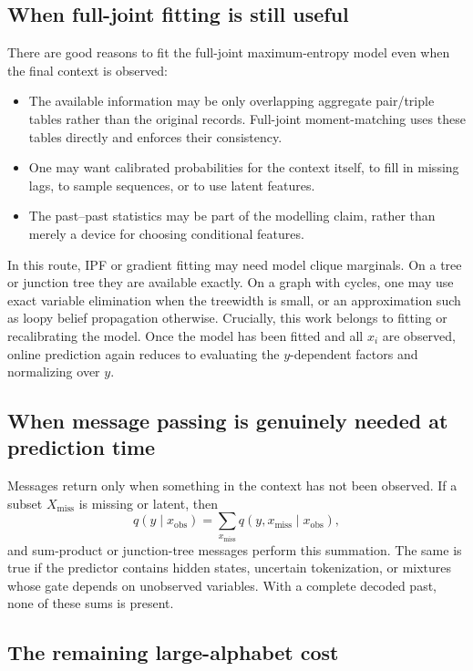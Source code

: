 \documentclass[11pt]{article}
\newcommand{\1}{\mathbf 1}
\begin{document}
\subsection{When full-joint fitting is still useful}

There are good reasons to fit the full-joint maximum-entropy model even when
the final context is observed:
\begin{itemize}
  \item The available information may be only overlapping aggregate
  pair/triple tables rather than the original records.  Full-joint
  moment-matching uses these tables directly and enforces their consistency.
  \item One may want calibrated probabilities for the context itself, to fill
  in missing lags, to sample sequences, or to use latent features.
  \item The past--past statistics may be part of the modelling claim, rather
  than merely a device for choosing conditional features.
\end{itemize}

In this route, IPF or gradient fitting may need model clique marginals.  On a
tree or junction tree they are available exactly.  On a graph with cycles,
one may use exact variable elimination when the treewidth is small, or an
approximation such as loopy belief propagation otherwise.  Crucially, this
work belongs to fitting or recalibrating the model.  Once the model has been
fitted and all \(x_i\) are observed, online prediction again reduces to
evaluating the \(y\)-dependent factors and normalizing over \(y\).

\subsection{When message passing is genuinely needed at prediction time}

Messages return only when something in the context has not been observed.
If a subset \(X_{\mathrm{miss}}\) is missing or latent, then
\[
  q(y\mid x_{\mathrm{obs}})
  =
  \sum_{x_{\mathrm{miss}}}
  q(y,x_{\mathrm{miss}}\mid x_{\mathrm{obs}}),
\]
and sum-product or junction-tree messages perform this summation.  The same is
true if the predictor contains hidden states, uncertain tokenization, or
mixtures whose gate depends on unobserved variables.  With a complete decoded
past, none of these sums is present.

\subsection{The remaining large-alphabet cost}
\end{document}

